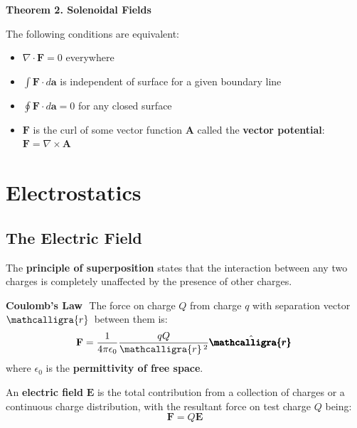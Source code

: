 \documentclass{article}
\newcommand{\scriptr}{\mathcalligra{r}\,}
\newcommand{\boldscriptr}{\pmb{\mathcalligra{r}}\,}
\begin{document}
\begin{theorem}{\textbf{Theorem 2. Solenoidal Fields}}
    $ $ \newline

    The following conditions are equivalent:
    \begin{itemize}
        \item \(\nabla \cdot \mathbf{F} =0\) everywhere
        \item \(\int  \mathbf{F} \cdot d \mathbf{a} \) is independent of surface for a given boundary line
        \item \(\oint \mathbf{F} \cdot d \mathbf{a}=0 \) for any closed surface
        \item \(\mathbf{F} \) is the curl of some vector function \(\mathbf{A}\) called the \textbf{vector potential}: \(\mathbf{F} =\nabla \times \mathbf{A} \)      
    \end{itemize}
\end{theorem}

\newpage
\section{Electrostatics}
\subsection{The Electric Field}
\begin{definition}
    The \textbf{principle of superposition} states that the interaction between any two charges is completely unaffected by the presence 
    of other charges.
\end{definition}

\begin{law}{\textbf{Coulomb's Law}}
    $ $ \newline
    The force on charge \(Q\) from charge \(q\) with separation vector \(\scriptr\) between them is:   
    \[
        \mathbf{F}=\frac{1}{4 \pi \epsilon_0}\frac{qQ}{\scriptr^2}\hat{\boldscriptr}
    \]
    where \(\epsilon_0\) is the \textbf{permittivity of free space}.
\end{law}

\begin{definition}
    An \textbf{electric field} \(\mathbf{E} \)  is the total contribution from a collection of charges or a continuous charge distribution, with the resultant force on test charge \(Q\) being: 
    \[
        \mathbf{F} =Q \mathbf{E} 
    \]
\end{definition}
\end{document}
